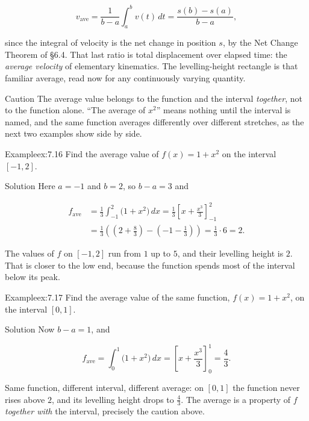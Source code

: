 \documentclass[a4paper,12pt,oneside]{memoir}
\begin{document}
\[ v_{\text{ave}} = \frac{1}{b - a}\int_{a}^{b} v(t)\,dt = \frac{s(b) - s(a)}{b - a}, \]

since the integral of velocity is the net change in position \(s\), by the Net Change Theorem of §6.4. That last ratio is total displacement over elapsed time: the \emph{average velocity} of elementary kinematics. The levelling-height rectangle is that familiar average, read now for any continuously varying quantity.

\begin{envcaution}{Caution}{}{}
The average value belongs to the function and the interval \emph{together}, not to the function alone. “The average of \(x^{2}\)” means nothing until the interval is named, and the same function averages differently over different stretches, as the next two examples show side by side.
\end{envcaution}
\begin{workedexample}
\begin{envexample}{Example}{ex:7.16}{}
Find the average value of \(f(x) = 1 + x^{2}\) on the interval \([-1, 2]\).
\end{envexample}
\begin{envsolution}{Solution}{}{}
Here \(a = -1\) and \(b = 2\), so \(b - a = 3\) and

\[ \begin{aligned}
          f_{\text{ave}} &= \frac{1}{3} \int_{-1}^{2} \bigl(1 + x^{2}\bigr)\,dx = \frac{1}{3}\left[x + \frac{x^{3}}{3}\right]_{-1}^{2} \\[2pt]
            &= \frac{1}{3}\left(\left(2 + \frac{8}{3}\right) - \left(-1 - \frac{1}{3}\right)\right) = \frac{1}{3}\cdot 6 = 2.
        \end{aligned} \]

The values of \(f\) on \([-1, 2]\) run from \(1\) up to \(5\), and their levelling height is \(2\). That is closer to the low end, because the function spends most of the interval below its peak. \qedmark
\end{envsolution}
\end{workedexample}
\begin{workedexample}
\begin{envexample}{Example}{ex:7.17}{}
Find the average value of the same function, \(f(x) = 1 + x^{2}\), on the interval \([0, 1]\).
\end{envexample}
\begin{envsolution}{Solution}{}{}
Now \(b - a = 1\), and

\[ f_{\text{ave}} = \int_{0}^{1} \bigl(1 + x^{2}\bigr)\,dx = \left[x + \frac{x^{3}}{3}\right]_{0}^{1} = \frac{4}{3}. \]

Same function, different interval, different average: on \([0, 1]\) the function never rises above \(2\), and its levelling height drops to \(\tfrac{4}{3}\). The average is a property of \(f\) \emph{together with} the interval, precisely the caution above. \qedmark
\end{envsolution}
\end{workedexample}
\end{document}
